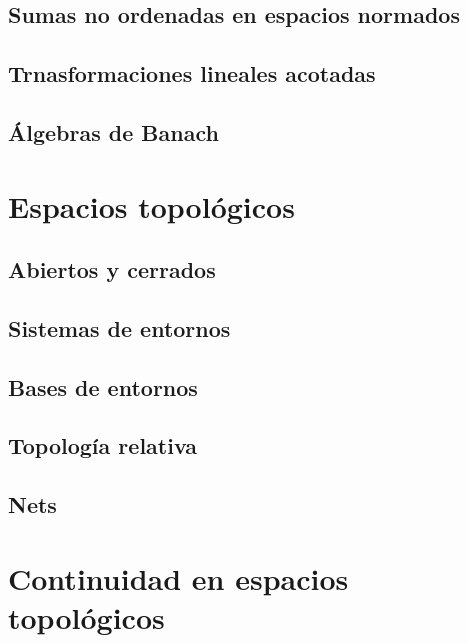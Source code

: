 \documentclass[12pt,]{krantz}
\theoremstyle{definition}
\theoremstyle{definition}
\theoremstyle{definition}
\theoremstyle{remark}
\begin{document}
\section{Sumas no ordenadas en espacios
normados}\label{sumas-no-ordenadas-en-espacios-normados}

\section{Trnasformaciones lineales
acotadas}\label{trnasformaciones-lineales-acotadas}

\section{Álgebras de Banach}\label{algebras-de-banach}

\chapter{Espacios topológicos}\label{espacios-topologicos}

\section{Abiertos y cerrados}\label{abiertos-y-cerrados}

\section{Sistemas de entornos}\label{sistemas-de-entornos}

\section{Bases de entornos}\label{bases-de-entornos}

\section{Topología relativa}\label{topologia-relativa}

\section{Nets}\label{nets}

\chapter{Continuidad en espacios
topológicos}\label{continuidad-en-espacios-topologicos}
\end{document}
